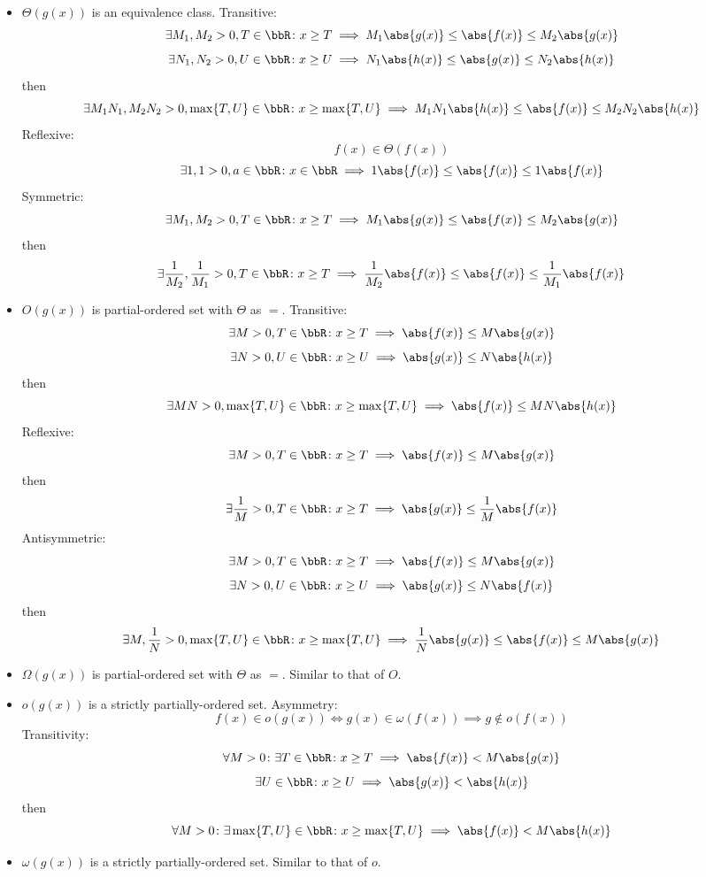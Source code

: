 \documentclass[a4paper,12pt]{report}
\begin{document}
\begin{itemize}
\begin{itemize}
\subsubsection{Binary relation}
\bit
\item $\Theta(g(x))$ is an equivalence class.
\bpr
Transitive:
\[\exists M_1,M_2>0,T\in\bbR\colon x\ge T\implies M_1\abs{g(x)}\le\abs{f(x)}\le M_2\abs{g(x)}\]
\[\exists N_1,N_2>0,U\in\bbR\colon x\ge U\implies N_1\abs{h(x)}\le\abs{g(x)}\le N_2\abs{h(x)}\]
then
\[\exists M_1N_1,M_2N_2>0,\max\{T,U\}\in\bbR\colon x\ge \max\{T,U\}\implies M_1N_1\abs{h(x)}\le\abs{f(x)}\le M_2N_2\abs{h(x)}\]
Reflexive:
\[f(x)\in\Theta(f(x))\]
\[\exists 1,1>0,a\in\bbR\colon x\in\bbR\implies 1\abs{f(x)}\le\abs{f(x)}\le 1\abs{f(x)}\]
Symmetric:
\[\exists M_1,M_2>0,T\in\bbR\colon x\ge T\implies M_1\abs{g(x)}\le\abs{f(x)}\le M_2\abs{g(x)}\]
then
\[\exists \frac{1}{M_2},\frac{1}{M_1}>0,T\in\bbR\colon x\ge T\implies \frac{1}{M_2}\abs{f(x)}\le\abs{f(x)}\le\frac{1}{M_1}\abs{f(x)}\]
\epr
\item $O(g(x))$ is partial-ordered set with $\Theta$ as $=$.
\bpr
Transitive:
\[\exists M>0,T\in\bbR\colon x\ge T\implies\abs{f(x)}\le M\abs{g(x)}\]
\[\exists N>0,U\in\bbR\colon x\ge U\implies\abs{g(x)}\le N\abs{h(x)}\]
then
\[\exists MN>0,\max\{T,U\}\in\bbR\colon x\ge\max\{T,U\}\implies\abs{f(x)}\le MN\abs{h(x)}\]
Reflexive:
\[\exists M>0,T\in\bbR\colon x\ge T\implies\abs{f(x)}\le M\abs{g(x)}\]
then
\[\exists \frac{1}{M}>0,T\in\bbR\colon x\ge T\implies\abs{g(x)}\le \frac{1}{M}\abs{f(x)}\]
Antisymmetric:
\[\exists M>0,T\in\bbR\colon x\ge T\implies\abs{f(x)}\le M\abs{g(x)}\]
\[\exists N>0,U\in\bbR\colon x\ge U\implies\abs{g(x)}\le N\abs{f(x)}\]
then
\[\exists M,\frac{1}{N}>0,\max\{T,U\}\in\bbR\colon x\ge \max\{T,U\}\implies\frac{1}{N}\abs{g(x)}\le\abs{f(x)}\le M\abs{g(x)}\]
\epr
\item $\Omega(g(x))$ is partial-ordered set with $\Theta$ as $=$.
\bpr
Similar to that of $O$.
\epr
\item $o(g(x))$ is a strictly partially-ordered set.
\bpr
Asymmetry:
\[f(x)\in o(g(x))\iff g(x)\in\omega(f(x))\implies g\notin o(f(x))\]
Transitivity:
\[\forall M>0\colon\exists T\in\bbR\colon x\ge T\implies\abs{f(x)}<M\abs{g(x)}\]
\[\exists U\in\bbR\colon x\ge U\implies\abs{g(x)}<\abs{h(x)}\]
then
\[\forall M>0\colon\exists \max\{T,U\}\in\bbR\colon x\ge \max\{T,U\}\implies\abs{f(x)}<M\abs{h(x)}\]
\epr
\item $\omega(g(x))$ is a strictly partially-ordered set.
\bpr
Similar to that of $o$.
\epr
\eit




\end{itemize}
\end{itemize}
\end{document}
